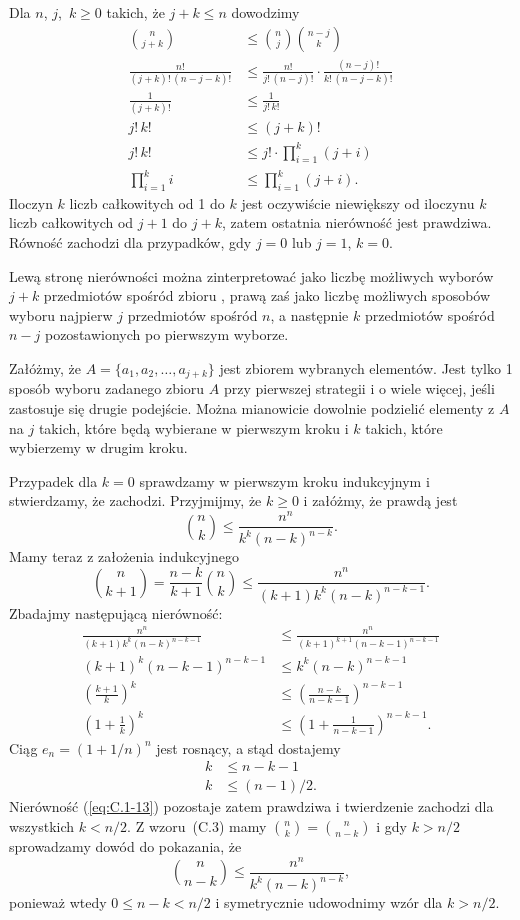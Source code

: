 \exercise{} %
\noindent Dla $n$, $j$,~$k\ge0$ takich, że $j+k\le n$ dowodzimy
\begin{align*}
	\binom{n}{j+k} &\le \binom{n}{j}\binom{n-j}{k} \\
	\frac{n!}{(j+k)!\,(n-j-k)!} &\le \frac{n!}{j!\,(n-j)!}\cdot\frac{(n-j)!}{k!\,(n-j-k)!} \\
	\frac{1}{(j+k)!} &\le \frac{1}{j!\,k!} \\
	j!\,k! &\le (j+k)! \\
	j!\,k! &\le j!\cdot\prod_{i=1}^k(j+i) \\
	\prod_{i=1}^ki &\le \prod_{i=1}^k(j+i).
\end{align*}
Iloczyn $k$ liczb całkowitych od 1 do $k$ jest oczywiście niewiększy od iloczynu $k$ liczb całkowitych od $j+1$ do $j+k$, zatem ostatnia nierówność jest prawdziwa. Równość zachodzi dla przypadków, gdy $j=0$ lub $j=1$, $k=0$.

Lewą stronę nierówności można zinterpretować jako liczbę możliwych wyborów $j+k$ przedmiotów spośród zbioru , prawą zaś jako liczbę możliwych sposobów wyboru najpierw $j$ przedmiotów spośród $n$, a następnie $k$ przedmiotów spośród $n-j$ pozostawionych po pierwszym wyborze.

Załóżmy, że $A=\{a_1,a_2,\dots,a_{j+k}\}$ jest zbiorem wybranych elementów. Jest tylko 1 sposób wyboru zadanego zbioru $A$ przy pierwszej strategii i o wiele więcej, jeśli zastosuje się drugie podejście. Można mianowicie dowolnie podzielić elementy z $A$ na $j$ takich, które będą wybierane w pierwszym kroku i $k$ takich, które wybierzemy w drugim kroku.

\exercise{} %
\noindent Przypadek dla $k=0$ sprawdzamy w pierwszym kroku indukcyjnym i stwierdzamy, że zachodzi. Przyjmijmy, że $k\ge0$ i załóżmy, że prawdą jest
\[
	\binom{n}{k} \le \frac{n^n}{k^k(n-k)^{n-k}}.
\]
Mamy teraz z założenia indukcyjnego
\[
	\binom{n}{k+1} = \frac{n-k}{k+1}\binom{n}{k} \le \frac{n^n}{(k+1)k^k(n-k)^{n-k-1}}.
\]
Zbadajmy następującą nierówność:
\begin{align}
	\frac{n^n}{(k+1)k^k(n-k)^{n-k-1}} &\le \frac{n^n}{(k+1)^{k+1}(n-k-1)^{n-k-1}} \nonumber \\[1mm]
	(k+1)^k(n-k-1)^{n-k-1} &\le k^k(n-k)^{n-k-1} \nonumber \\[1mm]
	\left(\frac{k+1}{k}\right)^k &\le \left(\frac{n-k}{n-k-1}\right)^{n-k-1} \nonumber \\
	\left(1+\frac{1}{k}\right)^k &\le \left(1+\frac{1}{n-k-1}\right)^{n-k-1}. \label{eq:C.1-13}
\end{align}
Ciąg $e_n={(1+1/n)}^n$ jest rosnący, a stąd dostajemy
\begin{align*}
	k &\le n-k-1 \\
	k &\le (n-1)/2.
\end{align*}
Nierówność (\ref{eq:C.1-13}) pozostaje zatem prawdziwa i twierdzenie zachodzi dla wszystkich $k<n/2$. Z wzoru~(C.3) mamy $\binom{n}{k}=\binom{n}{n-k}$ i gdy $k>n/2$ sprowadzamy dowód do pokazania, że
\[
	\binom{n}{n-k} \le \frac{n^n}{k^k(n-k)^{n-k}},
\]
ponieważ wtedy $0\le n-k<n/2$ i symetrycznie udowodnimy wzór dla $k>n/2$.

